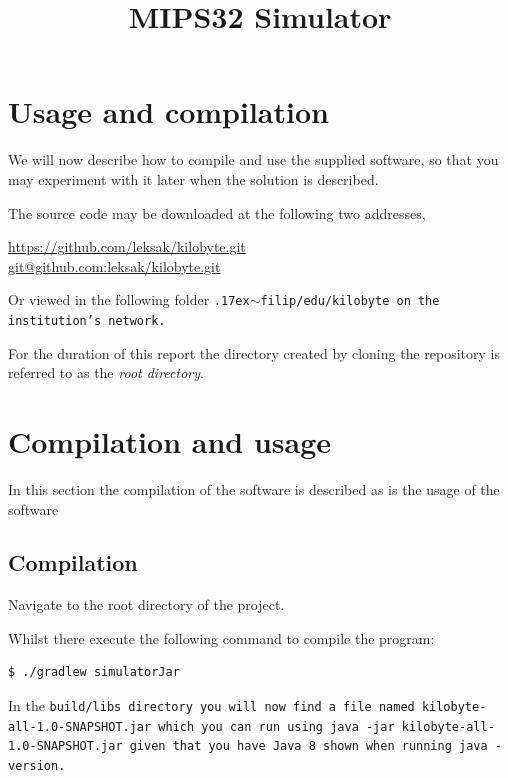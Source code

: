 
\newcommand{\titlename}{MIPS32 Simulator}
\title{\titlename}





\tableofcontents
\clearpage






\section{Usage and compilation}

We will now describe how to compile and use the supplied software, so
that you may experiment with it later when the solution is described.

The source code may be downloaded at the following two addresses,

\begin{center}
\url{https://github.com/leksak/kilobyte.git} \\
\url{git@github.com:leksak/kilobyte.git}
\end{center}

Or viewed in the following folder
\tt{\raise.17ex\hbox{$\scriptstyle\mathtt{\sim}$}filip/edu/kilobyte}
on the institution's network.

For the duration of this report the directory created by cloning
the repository is referred to as the \emph{root directory}.

\section{Compilation and usage}

In this section the compilation of the software is described as
is the usage of the software

\subsection{Compilation}

Navigate to the root directory of the project.

Whilst there execute the following command to compile the program:

\begin{lstlisting}[style=plain]
$ ./gradlew simulatorJar
\end{lstlisting}

In the \tt{build/libs} directory you will now find a file named
\tt{kilobyte-all-1.0-SNAPSHOT.jar} which you can run using \tt{java -jar
  kilobyte-all-1.0-SNAPSHOT.jar} given that you have Java 8 shown when running
\tt{java -version}.

